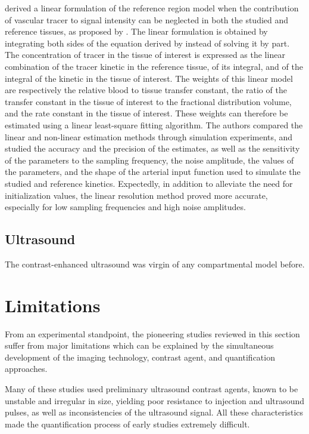 \citet{CardenasRodriguez:2013em} derived a linear formulation of the reference region model when the contribution of vascular tracer to signal intensity can be neglected in both the studied and reference tissues, as proposed by \citet{Yankeelov:2005dea}.
The linear formulation is obtained by integrating both sides of the equation derived by \citet{Yankeelov:2005dea} instead of solving it by part. 
The concentration of tracer in the tissue of interest is expressed as the linear combination of the tracer kinetic in the reference tissue, of its integral, and of the integral of the kinetic in the tissue of interest.
The weights of this linear model are respectively the relative blood to tissue transfer constant, the ratio of the transfer constant in the tissue of interest to the fractional distribution volume, and the rate constant in the tissue of interest.
These weights can therefore be estimated using a linear least-square fitting algorithm.
The authors compared the linear and non-linear estimation methods through simulation experiments, and studied the accuracy and the precision of the estimates, as well as the sensitivity of the parameters to the sampling frequency, the noise amplitude, the values of the parameters, and the shape of the arterial input function used to simulate the studied and reference kinetics.
Expectedly, in addition to alleviate the need for initialization values, the linear resolution method proved more accurate, especially for low sampling frequencies and high noise amplitudes.

\subsection{Ultrasound}
The contrast-enhanced ultrasound was virgin of any compartmental model before. 

\section{Limitations}
From an experimental standpoint, the pioneering studies reviewed in this section suffer from major limitations which can be explained by the simultaneous development of the imaging technology, contrast agent, and quantification approaches.

Many of these studies used preliminary ultrasound contrast agents, known to be unstable and irregular in size, yielding poor resistance to injection and ultrasound pulses, as well as inconsistencies of the ultrasound signal.
All these characteristics made the quantification process of early studies extremely difficult.

